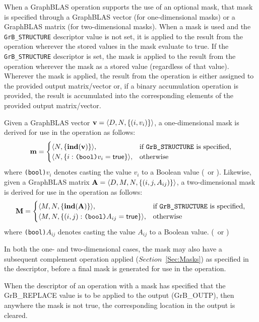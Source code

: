 When a GraphBLAS operation supports the use of an optional mask, that mask is
specified through a GraphBLAS vector (for one-dimensional masks) or
a GraphBLAS matrix (for two-dimensional masks).  When a mask is used and the 
{\tt GrB\_STRUCTURE} descriptor value is not set, it is applied to the result 
from the operation wherever the stored values in the mask evaluate to true.  If
the {\tt GrB\_STRUCTURE} descriptor is set, the mask is applied to the result
from the operation wherever the mask as a stored value (regardless of that value).
Wherever the mask is applied, the result from the operation is either assigned 
to the provided output matrix/vector or, if a binary accumulation operation is 
provided, the result is accumulated into the corresponding elements of the provided 
output matrix/vector.

Given a GraphBLAS vector ${\bf v} = \langle D,N, \{ (i,v_i) \} \rangle$, a
one-dimensional mask is derived for use in the operation as follows:
\[
{\bf m} = 
\begin{cases}
\langle N, \{ \mathbf{ind}({\bf v}) \} \rangle, & \mbox{if {\tt GrB\_STRUCTURE} is specified,} \\
\langle N, \{ i : \mbox{\tt (bool)}v_i = {\sf true} \} \rangle, & \mbox{otherwise}
\end{cases}
\]
where {\tt (bool)}$v_i$ denotes casting the value $v_i$ to a Boolean value (\true\ or \false).
Likewise, given a GraphBLAS matrix ${\bf A} = \langle D, M, N, \{ (i,j,A_{ij}) \} \rangle$,
a two-dimensional mask is derived for use in the operation as follows:
\[
{\bf M} = 
\begin{cases}
\langle M,N, \{ \mathbf{ind}({\bf A}) \} \rangle, & \mbox{if {\tt GrB\_STRUCTURE} is specified,} \\
\langle M,N, \{ (i,j) : \mbox{\tt (bool)}A_{ij} = {\sf true} \} \rangle, & \mbox{otherwise}
\end{cases}
\]
where {\tt (bool)}$A_{ij}$ denotes casting the value $A_{ij}$ to a Boolean value. 
(\true\ or \false)

In both the one- and two-dimensional cases, the mask may also have a subsequent 
complement operation applied ($Section$~\ref{Sec:Masks}) as specified in the 
descriptor, before a final mask is generated for use in the operation.

When the descriptor of an operation with a mask has specified that 
the {\sf GrB\_REPLACE} value is to be applied to the output ({\sf GrB\_OUTP}),
then anywhere the mask is not {\sf true}, the corresponding location in
the output is cleared.

